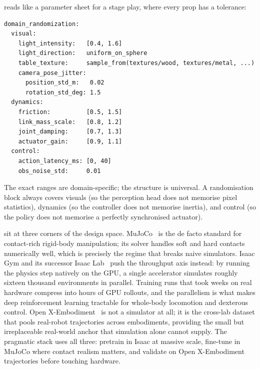  reads like a parameter sheet for a stage play, where every prop has a tolerance:

\begin{verbatim}
domain_randomization:
  visual:
    light_intensity:   [0.4, 1.6]
    light_direction:   uniform_on_sphere
    table_texture:     sample_from(textures/wood, textures/metal, ...)
    camera_pose_jitter:
      position_std_m:   0.02
      rotation_std_deg: 1.5
  dynamics:
    friction:          [0.5, 1.5]
    link_mass_scale:   [0.8, 1.2]
    joint_damping:     [0.7, 1.3]
    actuator_gain:     [0.9, 1.1]
  control:
    action_latency_ms: [0, 40]
    obs_noise_std:     0.01
\end{verbatim}

The exact ranges are domain-specific; the structure is universal. A randomisation block always covers visuals (so the perception head does not memorise pixel statistics), dynamics (so the controller does not memorise inertia), and control (so the policy does not memorise a perfectly synchronised actuator).

\vspace{1.5em}

 sit at three corners of the design space. MuJoCo~\cite{Todorov2012MuJoCo} is the de facto standard for contact-rich rigid-body manipulation; its solver handles soft and hard contacts numerically well, which is precisely the regime that breaks naive simulators. Isaac Gym and its successor Isaac Lab~\cite{Makoviychuk2021IsaacGym} push the throughput axis instead: by running the physics step natively on the GPU, a single accelerator simulates roughly sixteen thousand environments in parallel. Training runs that took weeks on real hardware compress into hours of GPU rollouts, and the parallelism is what makes deep reinforcement learning tractable for whole-body locomotion and dexterous control. Open X-Embodiment~\cite{Padalkar2024OpenXEmbodiment} is not a simulator at all; it is the cross-lab dataset that pools real-robot trajectories across embodiments, providing the small but irreplaceable real-world anchor that simulation alone cannot supply. The pragmatic stack uses all three: pretrain in Isaac at massive scale, fine-tune in MuJoCo where contact realism matters, and validate on Open X-Embodiment trajectories before touching hardware.


